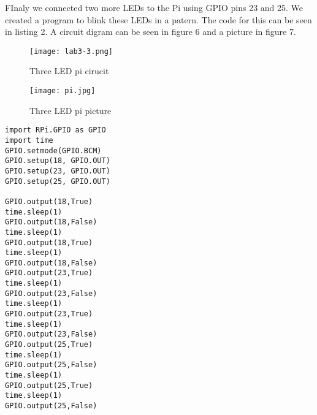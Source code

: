 \documentclass[prl,12pt,notitlepage,aps,onecolumn,superscriptaddress]{revtex4-1}
\begin{document}
FInaly we connected two more LEDs to the Pi using GPIO pins 23 and 25. We created a program to blink these LEDs in a patern. The code for this can be seen in listing 2. A circuit digram can be seen in figure 6 and a picture in figure 7.

\begin{figure}[h]
\begin{center}
\texttt{[image: lab3-3.png]}
\end{center}
\caption{\label{fig:pic} Three LED pi cirucit}
\end{figure}

\begin{figure}[h]
\begin{center}
\texttt{[image: pi.jpg]}
\end{center}
\caption{\label{fig:pic} Three LED pi picture}
\end{figure}

\begin{lstlisting}[caption=3 LED patern, label=amb]
import RPi.GPIO as GPIO
import time
GPIO.setmode(GPIO.BCM)
GPIO.setup(18, GPIO.OUT)
GPIO.setup(23, GPIO.OUT)
GPIO.setup(25, GPIO.OUT)

GPIO.output(18,True)
time.sleep(1)
GPIO.output(18,False)
time.sleep(1)
GPIO.output(18,True)
time.sleep(1)
GPIO.output(18,False)
GPIO.output(23,True)
time.sleep(1)
GPIO.output(23,False)
time.sleep(1)
GPIO.output(23,True)
time.sleep(1)
GPIO.output(23,False)
GPIO.output(25,True)
time.sleep(1)
GPIO.output(25,False)
time.sleep(1)
GPIO.output(25,True)
time.sleep(1)
GPIO.output(25,False)

\end{lstlisting}
\end{document}
